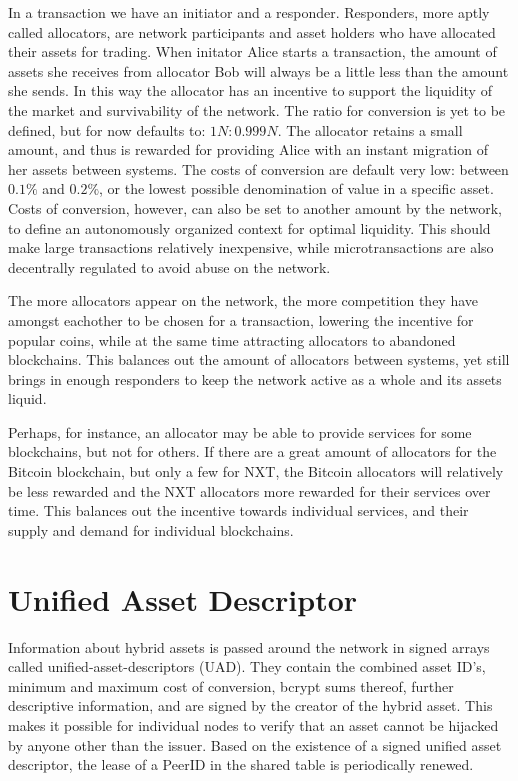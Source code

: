 \documentclass[a4paper,fullpack]{article}
\begin{document}
In a transaction we have an initiator and a responder. Responders, more aptly called allocators, are network participants and asset holders who have allocated their assets for trading. When initator Alice starts a transaction, the amount of assets she receives from allocator Bob will always be a little less than the amount she sends. In this way the allocator has an incentive to support the liquidity of the market and survivability of the network. The ratio for conversion is yet to be defined, but for now defaults to: $1N : 0.999N$.  The allocator retains a small amount, and thus is rewarded for providing Alice with an instant migration of her assets between systems. The costs of conversion are default very low: between $0.1\%$ and $0.2\%$, or the lowest possible denomination of value in a specific asset. Costs of conversion, however, can also be set to another amount by the network, to define an autonomously organized context for optimal liquidity. This should make large transactions relatively inexpensive, while microtransactions are also decentrally regulated to avoid abuse on the network.

The more allocators appear on the network, the more competition they have amongst eachother to be chosen for a transaction, lowering the incentive for popular coins, while at the same time attracting allocators to abandoned blockchains. This balances out the amount of allocators between systems, yet still brings in enough responders to keep the network active as a whole and its assets liquid.

Perhaps, for instance, an allocator may be able to provide services for some blockchains, but not for others. If there are a great amount of allocators for the Bitcoin blockchain, but only a few for NXT, the Bitcoin allocators will relatively be less rewarded and the NXT allocators more rewarded for their services over time. This balances out the incentive towards individual services, and their supply and demand for individual blockchains.


\section{Unified Asset Descriptor}

Information about hybrid assets is passed around the network in signed arrays called unified-asset-descriptors (UAD). They contain the combined asset ID's, minimum and maximum cost of conversion, bcrypt sums thereof, further descriptive information, and are signed by the creator of the hybrid asset. This makes it possible for individual nodes to verify that an asset cannot be hijacked by anyone other than the issuer. Based on the existence of a signed unified asset descriptor, the lease of a PeerID in the shared table is periodically renewed.
\end{document}

